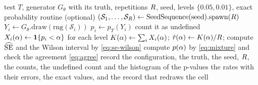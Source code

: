 \begin{algorithm}[htbp]
\caption{Measuring one cell of the size and power of a test.}
\label{alg:cell}
\begin{algorithmic}[1]
\Require test $T$, generator $G_\theta$ with its truth, repetitions $R$, seed, levels $\{0.05,0.01\}$, exact probability routine (optional)
\State $(\mathcal S_1,\dots,\mathcal S_R)\gets\mathrm{SeedSequence}(\mathrm{seed}).\mathrm{spawn}(R)$
  \State $Y_i\gets G_\theta.\mathrm{draw}(\mathrm{rng}(\mathcal S_i))$
  \State $p_i\gets p_T(Y_i)$ 
   \State count it as undefined \Else \State $X_i(\alpha)\gets\mathbf{1}\{p_i<\alpha\}$ for each level \EndIf
\EndFor
\State $K(\alpha)\gets\sum_iX_i(\alpha)$; $\hat{r}(\alpha)\gets K(\alpha)/R$; compute $\widehat{\mathrm{SE}}$ and the Wilson interval by \eqref{eq:se-wilson}
 \State compute $p(\alpha)$ by \eqref{eq:mixture} and check the agreement \eqref{eq:agree} \EndIf
\State record the configuration, the truth, the seed, $R$, the counts, the undefined count and the histogram of the p-values
\Ensure the rates with their errors, the exact values, and the record that redraws the cell
\end{algorithmic}
\end{algorithm}
